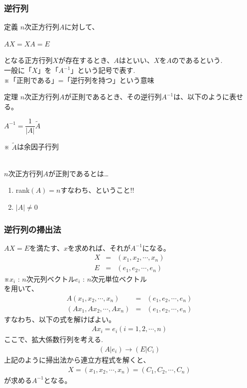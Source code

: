 \documentclass[a4paper]{jsarticle}
\begin{document}
\subsubsection{逆行列}
\begin{itembox}[l]{定義}
    $n$次正方行列$A$に対して、
    \begin{center}
        $AX=XA=E$
    \end{center}
    となる正方行列$X$が存在するとき、$A$はといい、$X$を$A$のであるという.\\
    一般に「$X$」を「$A^{-1}$」という記号で表す.\\
    ※「正則である」=「逆行列を持つ」という意味
\end{itembox}
\begin{itembox}[l]{定理}
    $n$次正方行列$A$が正則であるとき、その逆行列$A^{-1}$は、以下のように表せる。
    \begin{center}
        $A^{-1}=\dfrac{1}{|A|}\tilde{A}$
    \end{center}
    ※ $\tilde{A}$は余因子行列
\end{itembox}
\\
$n$次正方行列$A$が正則であるとは\dots
\begin{enumerate}[(1)]
    \item rank$\left(A\right)=n$\quad すなわち、ということ!!
    \item $\left|A\right|\neq0$
\end{enumerate}
\subsubsection{逆行列の掃出法}
$AX=E$\quad を満たす、$x$を求めれば、それが$A^{-1}$になる。
\begin{eqnarray*}
    X&=&\left(x_1,x_2,\cdots,x_n\right)\\
    E&=&\left(e_1,e_2,\cdots,e_n\right)
\end{eqnarray*}
※$x_i$ : $n$次元列ベクトル\quad $e_i$ : $n$次元単位ベクトル\\
を用いて、
\begin{eqnarray*}
    A\left(x_1,x_2,\cdots,x_n\right)&=&\left(e_1,e_2,\cdots,e_n\right)\\
    \left(Ax_1,Ax_2,\cdots,Ax_n\right)&=&\left(e_1,e_2,\cdots,e_n\right)
\end{eqnarray*}
すなわち、以下の式を解けばよい。
\begin{eqnarray*}
    Ax_i=e_i \left(i=1,2,\cdots,n\right)
\end{eqnarray*}
ここで、拡大係数行列を考える.
\begin{eqnarray*}
    \left(A|e_i\right) \rightarrow \left(E|C_i\right)
\end{eqnarray*}
上記のように掃出法から連立方程式を解くと、
\begin{eqnarray*}
    X=\left(x_1,x_2,\cdots,x_n\right)=\left(C_1,C_2,\cdots,C_n\right)
\end{eqnarray*}
が求める$A^{-1}$となる。
\end{document}
